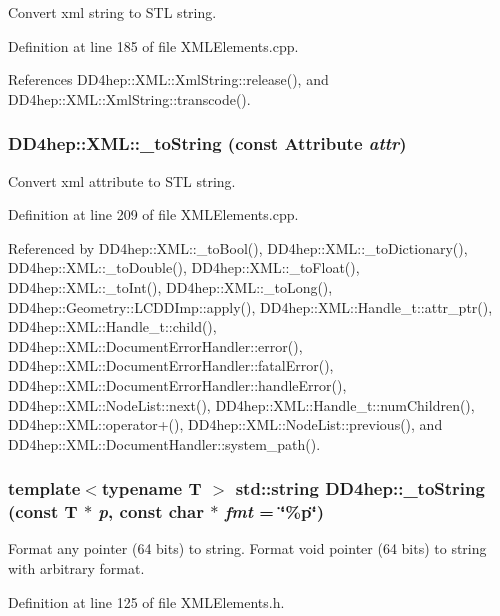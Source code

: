 Convert xml string to STL string. 

Definition at line 185 of file XMLElements.cpp.

References DD4hep::XML::XmlString::release(), and DD4hep::XML::XmlString::transcode().\hypertarget{group___d_d4_h_e_p___x_m_l_gad2124529d3b80b7896b4d5a370ee906e}{
\subsubsection[{\_\-toString}]{ DD4hep::XML::\_\-toString (const Attribute {\em attr})}}
\label{group___d_d4_h_e_p___x_m_l_gad2124529d3b80b7896b4d5a370ee906e}


Convert xml attribute to STL string. 

Definition at line 209 of file XMLElements.cpp.

Referenced by DD4hep::XML::\_\-toBool(), DD4hep::XML::\_\-toDictionary(), DD4hep::XML::\_\-toDouble(), DD4hep::XML::\_\-toFloat(), DD4hep::XML::\_\-toInt(), DD4hep::XML::\_\-toLong(), DD4hep::Geometry::LCDDImp::apply(), DD4hep::XML::Handle\_\-t::attr\_\-ptr(), DD4hep::XML::Handle\_\-t::child(), DD4hep::XML::DocumentErrorHandler::error(), DD4hep::XML::DocumentErrorHandler::fatalError(), DD4hep::XML::DocumentErrorHandler::handleError(), DD4hep::XML::NodeList::next(), DD4hep::XML::Handle\_\-t::numChildren(), DD4hep::XML::operator+(), DD4hep::XML::NodeList::previous(), and DD4hep::XML::DocumentHandler::system\_\-path().\hypertarget{group___d_d4_h_e_p___x_m_l_ga4ca22c7dce6a70d4f7908b3f1340624c}{
\subsubsection[{\_\-toString}]{\setlength{\rightskip}{0pt plus 5cm}template$<$typename T $>$ std::string DD4hep::\_\-toString (const {\bf T} $\ast$ {\em p}, \/  const char $\ast$ {\em fmt} = {\ttfamily \char`\"{}\%p\char`\"{}})}}
\label{group___d_d4_h_e_p___x_m_l_ga4ca22c7dce6a70d4f7908b3f1340624c}


Format any pointer (64 bits) to string. Format void pointer (64 bits) to string with arbitrary format. 

Definition at line 125 of file XMLElements.h.

